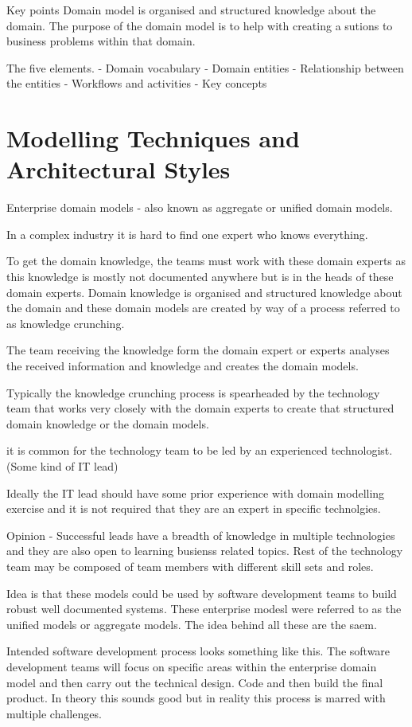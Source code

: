 Key points
Domain model is organised and structured knowledge about the domain.
The purpose of the domain model is to help with creating a sutions to business problems within that domain.

The five elements.
- Domain vocabulary
- Domain entities
- Relationship between the entities
- Workflows and activities
- Key concepts

\section{Modelling Techniques and Architectural Styles}
Enterprise domain models  - also known as aggregate or unified domain models.

In a complex industry it is hard to find one expert who knows everything.

To get the domain knowledge, the teams must work with these domain experts as this knowledge is mostly not documented anywhere but is in the heads of these domain experts.
Domain knowledge is organised and structured knowledge about the domain and these domain models are created by way of a process referred to as knowledge crunching.

The team receiving the knowledge form the domain expert or experts analyses the received information and knowledge and creates the domain models.

Typically the knowledge crunching process is spearheaded by the technology team that works very closely with the domain experts to create that structured domain knowledge or the domain models.

it is common for the technology team to be led by an experienced technologist. (Some kind of IT lead)

Ideally the IT lead should have some prior experience with domain modelling exercise and it is not required that they are an expert in specific technolgies.

Opinion
- Successful leads have a breadth of knowledge in multiple technologies and they are also open to learning busienss related topics.
Rest of the technology team may be composed of team members with different skill sets and roles.

Idea is that these models could be used by software development teams to build robust well documented systems.
These enterprise modesl were referred to as the unified models or aggregate models.
The idea behind all these are the saem.

Intended software development process looks something like this.
The software development teams will focus on specific areas within the enterprise domain model and then carry out the technical design.
Code and then build the final product.
In theory this sounds good but in reality this process is marred with multiple challenges.

